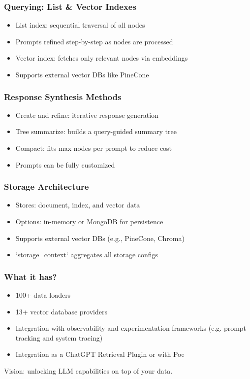 \begin{frame}[fragile]\frametitle{Querying: List \& Vector Indexes}
    \begin{itemize}
        \item List index: sequential traversal of all nodes
        \item Prompts refined step-by-step as nodes are processed
        \item Vector index: fetches only relevant nodes via embeddings
        \item Supports external vector DBs like PineCone
    \end{itemize}
\end{frame}

\begin{frame}[fragile]\frametitle{Response Synthesis Methods}
    \begin{itemize}
        \item Create and refine: iterative response generation
        \item Tree summarize: builds a query-guided summary tree
        \item Compact: fits max nodes per prompt to reduce cost
        \item Prompts can be fully customized
    \end{itemize}
\end{frame}

\begin{frame}[fragile]\frametitle{Storage Architecture}
    \begin{itemize}
        \item Stores: document, index, and vector data
        \item Options: in-memory or MongoDB for persistence
        \item Supports external vector DBs (e.g., PineCone, Chroma)
        \item `storage\_context` aggregates all storage configs
    \end{itemize}
\end{frame}

\begin{frame}[fragile]\frametitle{What it has?}


\begin{itemize}
\item 100+ data loaders
\item 13+ vector database providers
\item Integration with observability and experimentation frameworks (e.g. prompt tracking and system tracing)
\item Integration as a ChatGPT Retrieval Plugin or with Poe
\end{itemize}	

Vision: unlocking LLM capabilities on top of your data.
\end{frame}

